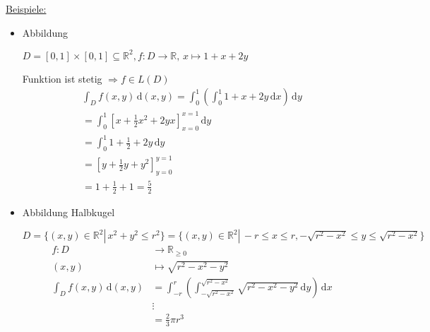\underline{Beispiele:}\\
\begin{itemize}
    \item \begin{minipage}{0.333\textwidth}
        Abbildung
    \end{minipage}
    \begin{minipage}{0.666\textwidth}
        $D=[0,1]\times[0,1] \subseteq\mathbb{R}^2, f\colon D\to \mathbb{R}, \, x\mapsto 1+x+2y$
    \end{minipage}
    Funktion ist stetig $\Rightarrow f\in L(D)$\\
     \begin{align*}
         \int_D f(x,y)\,\text{d}(x,y) = \int_0^1\left(\int_0^1 1+x+2y \,\text{d}x\right)\,\text{d}y\\
         = \int_0^1 \left[x+\frac{1}{2}x^2+2yx\right]_{x=0}^{x=1}\,\text{d}y\\
         = \int_0^1 1+\frac{1}{2}+2y\,\text{d}y\\
         = \left[y+\frac{1}{2}y+y^2\right]_{y=0}^{y=1}\\
         = 1+\frac{1}{2}+1=\frac{5}{2}
     \end{align*}
     \item \begin{minipage}{0.333\textwidth}
         Abbildung Halbkugel
     \end{minipage}
     \begin{minipage}{0.666\textwidth}
         $D=\{(x,y)\in\mathbb{R}^2 | \, x^2 +y^2 \leq r^2\} = \{(x,y)\in\mathbb{R}^2 | \, -r\leq x\leq r, -\sqrt{r^2 - x^2} \leq y\leq \sqrt{r^2 - x^2}\}$
         \begin{align*}
         f\colon D&\to\mathbb{R}_{\geq 0}\\
         (x,y)&\mapsto \sqrt{r^2 -x^2-y^2}\\
         \int_D f(x,y)\,\text{d}(x,y) &= \int_{-r}^r\left(\int_{-\sqrt{r^2 -x^2}}^{\sqrt{r^2 -x^2}} \sqrt{r^2-x^2-y^2}\,\text{d}y\right)\,\text{d}x\\
         &\vdots\\
         &= \frac{2}{3}\pi r^3
         \end{align*}
        \end{minipage}
\end{itemize}